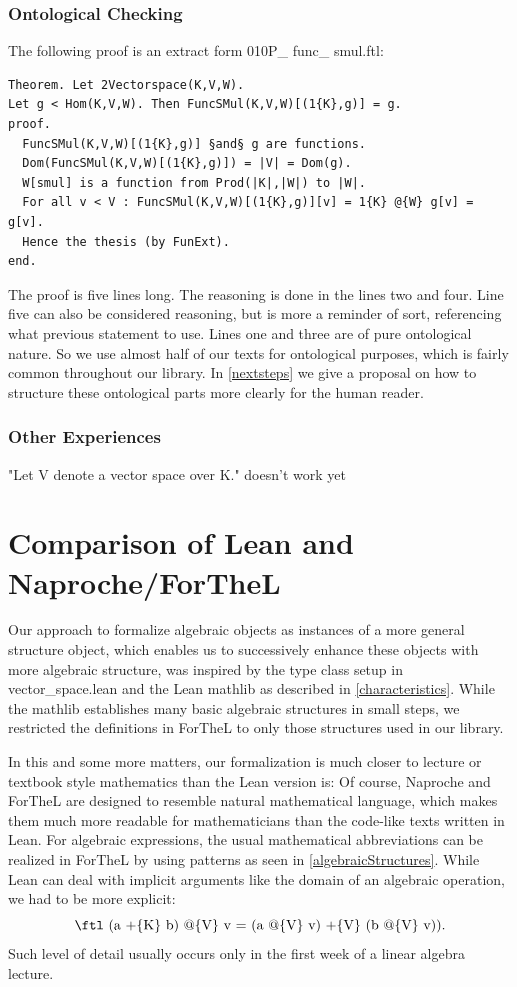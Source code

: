 \documentclass[11pt]{article}
\begin{document}
\subsubsection{Ontological Checking} \label{ontologialChecking}
The following proof is an extract form 010P\_ func\_ smul.ftl:
\begin{lstlisting}
Theorem. Let 2Vectorspace(K,V,W).
Let g < Hom(K,V,W). Then FuncSMul(K,V,W)[(1{K},g)] = g.
proof.
  FuncSMul(K,V,W)[(1{K},g)] §and§ g are functions.
  Dom(FuncSMul(K,V,W)[(1{K},g)]) = |V| = Dom(g).
  W[smul] is a function from Prod(|K|,|W|) to |W|.
  For all v < V : FuncSMul(K,V,W)[(1{K},g)][v] = 1{K} @{W} g[v] = g[v].
  Hence the thesis (by FunExt).
end.
\end{lstlisting}
The proof is five lines long. The reasoning is done in the lines two and four. Line five can also be considered reasoning, but is more a reminder of sort, referencing what previous statement to use. Lines one and three are of pure ontological nature. So we use almost half of our texts for ontological purposes, which is fairly common throughout our library. In \ref{nextsteps} we give a proposal on how to structure these ontological parts more clearly for the human reader.


\subsubsection{Other Experiences}
"Let V denote a vector space over K." doesn't work yet


\newpage
\section{Comparison of Lean and Naproche/ForTheL}
Our approach to formalize algebraic objects as instances of a more general {\ftl structure} object, which enables us to successively enhance these objects with more algebraic structure, was inspired by the type class setup in vector\_space.lean and the Lean mathlib as described in \ref{characteristics}.
While the mathlib establishes many basic algebraic structures in small steps, we restricted the definitions in ForTheL to only those structures used in our library.

In this and some more matters, our formalization is much closer to lecture or textbook style mathematics than the Lean version is:
Of course, Naproche and ForTheL are designed to resemble natural mathematical language, which makes them much more readable for mathematicians than the code-like texts written in Lean. For algebraic expressions, the usual mathematical abbreviations can be realized in ForTheL by using patterns as seen in \ref{algebraicStructures}.
While Lean can deal with implicit arguments like the domain of an algebraic operation, we had to be more explicit:
$$\text{\ftl (a +\{K\} b) @\{V\} v = (a @\{V\} v) +\{V\} (b @\{V\} v)).}$$
Such level of detail usually occurs only in the first week of a linear algebra lecture.
\end{document}
